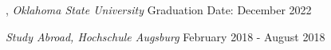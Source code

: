 
, \textit{Oklahoma State University} \hfill	Graduation Date: December 2022

\textit{Study Abroad, Hochschule Augsburg} 	\hfill  February 2018 - August 2018



